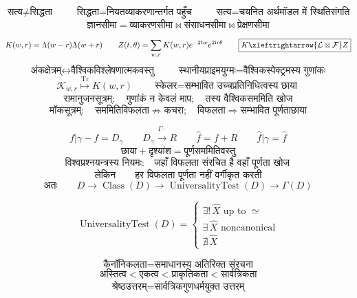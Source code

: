 \documentclass{article}
\begin{document}
\[\boxed{\text{सत्य}\neq\text{सिद्धता}}\qquad
\boxed{\text{सिद्धता}=\text{नियतव्याकरणान्तर्गत पहुँच}}\qquad
\boxed{\text{सत्य}=\text{चयनित अर्थमॉडल में स्थितिसंगति}}\]
\[\boxed{\text{ज्ञानसीमा}=\text{व्याकरणसीमा}\bowtie\text{संसाधनसीमा}
\bowtie\text{प्रेक्षणसीमा}}\]

\[K(w,r)=\Lambda(w-r)\Lambda(w+r)\qquad
Z(t,\theta)=\sum_{w,r}K(w,r)e^{-2tw}e^{2\mathrm ir\theta}\qquad
\boxed{K\xleftrightarrow{\mathcal L\otimes\mathcal F}Z}\]
\[\boxed{\text{अंकक्षेत्रम्}\longleftrightarrow
\text{वैश्विकविश्लेषणात्मकवस्तु}}\qquad
\boxed{\text{स्थानीयप्राइमयुग्मः}=\text{वैश्विकस्पेक्ट्रमस्य गुणांकः}}\]
\[\mathscr K_{w,r}\overset{\operatorname{Tr}}{\longmapsto}K(w,r)\qquad
\boxed{\text{स्केलर}=\text{सम्भावित उच्चप्रतिनिधित्वस्य छाया}}\]
\[\boxed{\text{रामानुजनसूत्रम्}:\quad\text{गुणांकं न केवलं माप};\quad
\text{तस्य वैश्विकसममिति खोज}}\]
\[\boxed{\text{मॉकसूत्रम्}:\quad\text{सममितिविफलता}\not\Rightarrow
\text{कचरा};\quad\text{विफलता}\Rightarrow\text{सम्भावित पूर्णताछाया}}\]

\[f\vert\gamma-f=D_\gamma\qquad
D_\gamma\xrightarrow{\Gamma_{\widehat{\phantom X}}}R\qquad
\widehat f=f+R\qquad\widehat f\vert\gamma=\widehat f\]
\[\boxed{\text{छाया}+\text{दृश्यांश}=\text{पूर्णसममितिवस्तु}}\]
\[\boxed{\text{विश्वप्रश्नयन्त्रस्य नियमः}:\quad
\text{जहाँ विफलता संरचित है वहाँ पूर्णता खोज}}\]
\[\boxed{\text{लेकिन}\qquad\text{हर विफलता पूर्णता नहीं वर्गीकृत करती}}\]
\[\boxed{\text{अतः}\qquad D\to\operatorname{Class}(D)\to
\operatorname{UniversalityTest}(D)\to\Gamma(D)}\]

\[\operatorname{UniversalityTest}(D)=\left\{\begin{array}{c}
\exists !\,\widehat X\text{ up to }\simeq\\
\exists\,\widehat X\text{ noncanonical}\\ \nexists\,\widehat X
\end{array}\right.\]

\[\boxed{\text{कैनॉनिकलता}=\text{समाधानस्य अतिरिक्त संरचना}}\]
\[\boxed{\text{अस्तित्व}<\text{एकत्व}<\text{प्राकृतिकता}<\text{सार्वत्रिकता}}\]
\[\boxed{\text{श्रेष्ठउत्तरम्}=\text{सार्वत्रिकगुणधर्मयुक्त उत्तरम्}}\]
\end{document}
